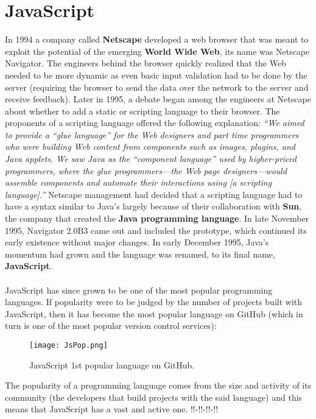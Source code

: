 \documentclass{l4proj}
\begin{document}
\section{JavaScript}
\hspace*{3em} In 1994 a company called \textbf{Netscape} developed a web browser that was meant to exploit the potential of the emerging \textbf{World Wide Web}, its name was Netscape Navigator. The engineers behind the browser quickly realized that the Web needed to be more dynamic as even basic input validation had to be done by the server (requiring the browser to send the data over the network to the server and receive feedback). Later in 1995, a debate began among the engineers at Netscape about whether to add a static or scripting language to their browser. The proponents of a scripting language offered the following explanation:\cite{jsgrandpa} 
\textit{``We aimed to provide a “glue language” for the Web designers and part time programmers who were building Web content from components such as images, plugins, and Java applets. We saw Java as the “component language” used by higher-priced programmers, where the glue programmers—the Web page designers—would assemble components and automate their interactions using [a scripting language].''}
Netscape management had decided that a scripting language had to have a syntax similar to Java’s largely because of their collaboration with \textbf{Sun}, the company that created the \textbf{Java programming language}. In late November 1995, Navigator 2.0B3 came out and included the prototype, which continued its early existence without major changes. In early December 1995, Java’s momentum had grown and the language was renamed, to its final name, \textbf{JavaScript}.\cite{jsdaddy}
\\\\
\hspace*{3em} JavaScript has since grown to be one of the most popular programming languages. If popularity were to be judged by the number of projects built with JavaScript, then it has become the most popular language on GitHub\cite{github} (which in turn is one of the most popular version control services):

\begin{figure}[!ht]
  \centering
    \texttt{[image: JsPop.png]}
    \caption{JavaScript 1st popular language on GitHub.\cite{githut}}
\end{figure}
The popularity of a programming language comes from the size and activity of its community (the developers that build projects with the said language) and this means that JavaScript has a vast and active one. !!-!!-!!-!!
\end{document}
